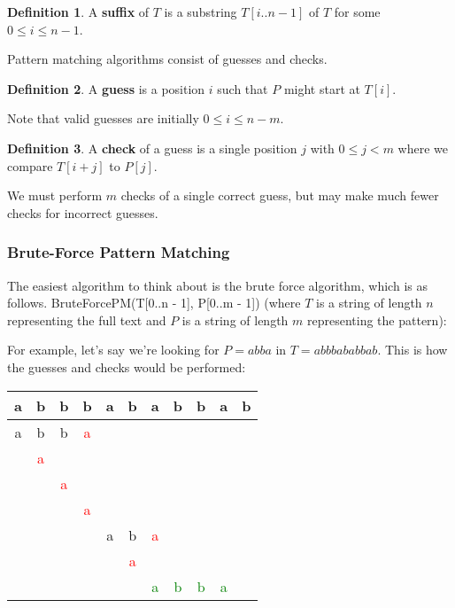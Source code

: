 \documentclass[]{article}
\theoremstyle{definition}
\newtheorem*{defn}{Definition}
\begin{document}
			\begin{defn}
				A \textbf{suffix} of $T$ is a substring $T[i..n - 1]$ of $T$ for some $0 \le i \le n - 1$.
			\end{defn}

			Pattern matching algorithms consist of guesses and checks.
			\begin{defn}
				A \textbf{guess} is a position $i$ such that $P$ might start at $T[i]$.
			\end{defn}

			Note that valid guesses are initially $0 \le i \le n - m$.

			\begin{defn}
				A \textbf{check} of a guess is a single position $j$ with $0 \le j < m$ where we compare $T[i + j]$ to $P[j]$.
			\end{defn}

			We must perform $m$ checks of a single correct guess, but may make much fewer checks for incorrect guesses.
			
			\subsubsection{Brute-Force Pattern Matching}
				The easiest algorithm to think about is the brute force algorithm, which is as follows. BruteForcePM(T[0..n - 1], P[0..m - 1]) (where $T$ is a string of length $n$ representing the full text and $P$ is a string of length $m$ representing the pattern): \\
				\begin{algorithm}[H]
				\end{algorithm}

				For example, let's say we're looking for $P = abba$ in $T = abbbababbab$. This is how the guesses and checks would be performed:
				\begin{center}
					\begin{tabular}{|c|c|c|c|c|c|c|c|c|c|c|}
						\hline
						\textbf{a} & \textbf{b} & \textbf{b} & \textbf{b} & \textbf{a} & \textbf{b} & \textbf{a} & \textbf{b} & \textbf{b} & \textbf{a} & \textbf{b} \\ \hline
						a & b & b & \textcolor{red}{a} & & & & & & & \\
						& \textcolor{red}{a} & & & & & & & & & \\
						& & \textcolor{red}{a} & & & & & & & & \\
						& & & \textcolor{red}{a} & & & & & & & \\
						& & & & a & b & \textcolor{red}{a} & & & & \\
						& & & & & \textcolor{red}{a} & & & & & \\
						& & & & & & \textcolor{green}{a} & \textcolor{green}{b} & \textcolor{green}{b} & \textcolor{green}{a} & \\
						\hline
					\end{tabular}
				\end{center}
\end{document}
